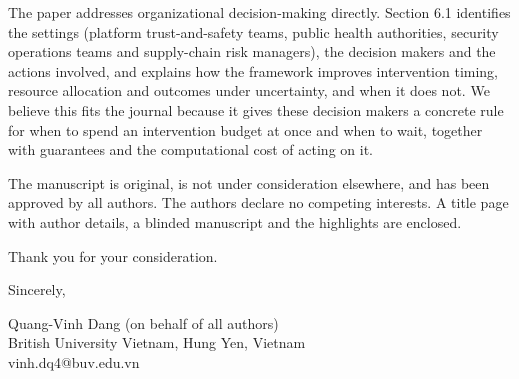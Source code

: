 \documentclass[11pt]{article}
\begin{document}
The paper addresses organizational decision-making directly. Section 6.1 identifies the settings (platform trust-and-safety teams, public health authorities, security operations teams and supply-chain risk managers), the decision makers and the actions involved, and explains how the framework improves intervention timing, resource allocation and outcomes under uncertainty, and when it does not. We believe this fits the journal because it gives these decision makers a concrete rule for when to spend an intervention budget at once and when to wait, together with guarantees and the computational cost of acting on it.

The manuscript is original, is not under consideration elsewhere, and has been approved by all authors. The authors declare no competing interests. A title page with author details, a blinded manuscript and the highlights are enclosed.

Thank you for your consideration.

Sincerely,

Quang-Vinh Dang (on behalf of all authors)\\
British University Vietnam, Hung Yen, Vietnam\\
vinh.dq4@buv.edu.vn
\end{document}

